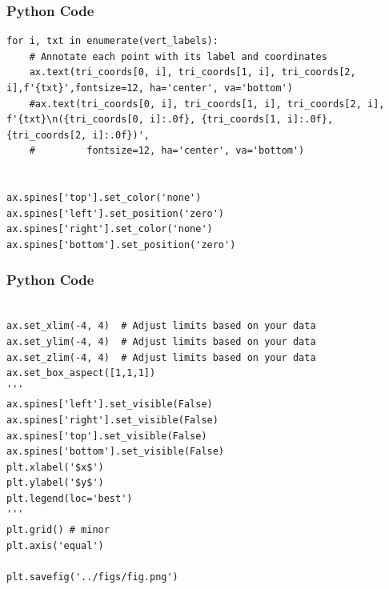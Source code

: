 \documentclass{beamer}
\begin{document}
\begin{frame}[fragile]
    \frametitle{Python Code}
    \begin{lstlisting}
for i, txt in enumerate(vert_labels):
    # Annotate each point with its label and coordinates
    ax.text(tri_coords[0, i], tri_coords[1, i], tri_coords[2, i],f'{txt}',fontsize=12, ha='center', va='bottom')
    #ax.text(tri_coords[0, i], tri_coords[1, i], tri_coords[2, i], f'{txt}\n({tri_coords[0, i]:.0f}, {tri_coords[1, i]:.0f}, {tri_coords[2, i]:.0f})',
    #         fontsize=12, ha='center', va='bottom')


ax.spines['top'].set_color('none')
ax.spines['left'].set_position('zero')
ax.spines['right'].set_color('none')
ax.spines['bottom'].set_position('zero')

    \end{lstlisting}
\end{frame}
\begin{frame}[fragile]
    \frametitle{Python Code}
    \begin{lstlisting}

ax.set_xlim(-4, 4)  # Adjust limits based on your data
ax.set_ylim(-4, 4)  # Adjust limits based on your data
ax.set_zlim(-4, 4)  # Adjust limits based on your data
ax.set_box_aspect([1,1,1])  
'''
ax.spines['left'].set_visible(False)
ax.spines['right'].set_visible(False)
ax.spines['top'].set_visible(False)
ax.spines['bottom'].set_visible(False)
plt.xlabel('$x$')
plt.ylabel('$y$')
plt.legend(loc='best')
'''
plt.grid() # minor
plt.axis('equal')

plt.savefig('../figs/fig.png')
    \end{lstlisting}
\end{frame}
\end{document}
